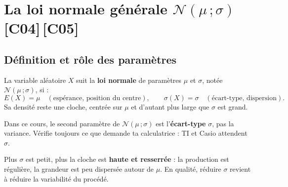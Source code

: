 \documentclass[a4paper,11pt]{article}
\begin{document}
\newpage
\section{La loi normale générale \texorpdfstring{$\mathcal{N}(\mu\,;\sigma)$}{N(mu;sigma)} \hfill {\normalsize\color{uimmred}[C04]\,[C05]}}

\subsection{Définition et rôle des paramètres}

\begin{definition}
La variable aléatoire $X$ suit la \textbf{loi normale} de paramètres $\mu$ et $\sigma$, notée $\mathcal{N}(\mu\,;\sigma)$, si :
\[
E(X) = \mu \quad (\text{espérance, position du centre}), \qquad \sigma(X) = \sigma \quad (\text{écart-type, dispersion}).
\]
Sa densité reste une cloche, centrée sur $\mu$ et d'autant plus large que $\sigma$ est grand.
\end{definition}

\begin{remarque}
Dans ce cours, le second paramètre de $\mathcal{N}(\mu\,;\sigma)$ est l'\textbf{écart-type} $\sigma$, pas la variance. Vérifie toujours ce que demande ta calculatrice : TI et Casio attendent $\sigma$.
\end{remarque}

\begin{center}
\end{center}

\begin{remarque}
Plus $\sigma$ est petit, plus la cloche est \textbf{haute et resserrée} : la production est régulière, la grandeur est peu dispersée autour de $\mu$. En qualité, réduire $\sigma$ revient à réduire la variabilité du procédé.
\end{remarque}
\end{document}

